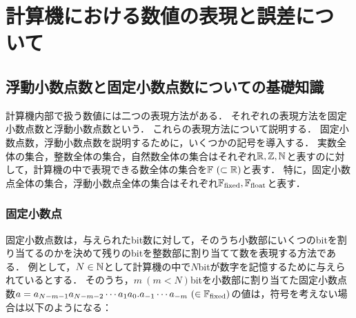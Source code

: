 \chapter{計算機における数値の表現と誤差について}
\label{chap:基礎知識1}

\section{浮動小数点数と固定小数点数についての基礎知識}
計算機内部で扱う数値には二つの表現方法がある．
それぞれの表現方法を固定小数点数と浮動小数点数という．
これらの表現方法について説明する．
固定小数点数，浮動小数点数を説明するために，いくつかの記号を導入する．
実数全体の集合，整数全体の集合，自然数全体の集合はそれぞれ$ \mathbb{R}, \mathbb{Z}, \mathbb{N}$と表すのに対して，計算機の中で表現できる数全体の集合を$\mathbb{F} \ (\subset \mathbb{R})$と表す．
特に，固定小数点全体の集合，浮動小数点全体の集合はそれぞれ$\mathbb{F}_{\text{fixed}},\mathbb{F}_{\text{float}}$と表す．



\subsection{固定小数点}
固定小数点数は，与えられたbit数に対して，そのうち小数部にいくつのbitを割り当てるのかを決めて残りのbitを整数部に割り当てて数を表現する方法である．
例として，$N \in \mathbb{N}$として計算機の中で$N$bitが数字を記憶するために与えられているとする．
そのうち，$m \ (m < N)$bitを小数部に割り当てた固定小数点数$a = a_{N-m-1} a_{N-m-2} \cdots a_1 a_0. a_{-1} \cdots a_{-m} \ (\in \mathbb{F}_{\text{fixed}})$の値は，符号を考えない場合は以下のようになる：

